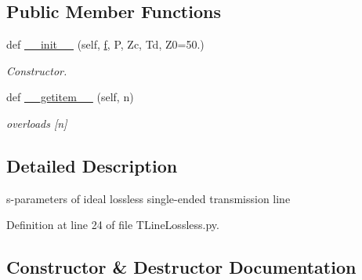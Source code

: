 \subsection*{Public Member Functions}
\begin{DoxyCompactItemize}
\item 
def \hyperlink{classSignalIntegrity_1_1SParameters_1_1Devices_1_1TLineLossless_1_1TLineLossless_a392b53d98394dd9067924804c683ea5c}{\+\_\+\+\_\+init\+\_\+\+\_\+} (self, \hyperlink{classSignalIntegrity_1_1SParameters_1_1SParameters_1_1SParameters_a32e7a34d6837fe949b413c852a0447f8}{f}, P, Zc, Td, Z0=50.)
\begin{DoxyCompactList}\small\item\em Constructor. \end{DoxyCompactList}\item 
def \hyperlink{classSignalIntegrity_1_1SParameters_1_1Devices_1_1TLineLossless_1_1TLineLossless_ab7a6da5139e0878b590d68292aaa70f2}{\+\_\+\+\_\+getitem\+\_\+\+\_\+} (self, n)
\begin{DoxyCompactList}\small\item\em overloads \mbox{[}n\mbox{]} \end{DoxyCompactList}\end{DoxyCompactItemize}


\subsection{Detailed Description}
s-\/parameters of ideal lossless single-\/ended transmission line 

Definition at line 24 of file T\+Line\+Lossless.\+py.



\subsection{Constructor \& Destructor Documentation}
\mbox{\label{classSignalIntegrity_1_1SParameters_1_1Devices_1_1TLineLossless_1_1TLineLossless_a392b53d98394dd9067924804c683ea5c}} 
